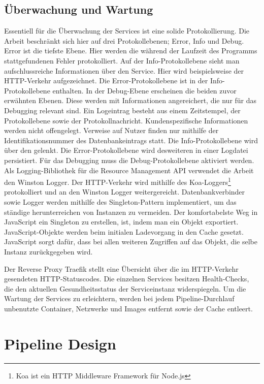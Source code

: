 \subsection{Überwachung und Wartung}
\label{subsec:ueberwachungundwartung}
Essentiell für die Überwachung der Services ist eine solide Protokollierung.
Die Arbeit beschränkt sich hier auf drei Protokollebenen; Error, Info und Debug.
Error ist die tiefste Ebene. Hier werden die während der Laufzeit des Programms
stattgefundenen Fehler protokolliert. Auf der Info-Protokollebene sieht man
aufschlussreiche Informationen über den Service. Hier wird beispielsweise
der HTTP-Verkehr aufgezeichnet. Die Error-Protokollebene ist in der Info-Protokollebene
enthalten. In der Debug-Ebene erscheinen die beiden zuvor erwähnten Ebenen. Diese
werden mit Informationen angereichert, die nur für das Debugging relevant sind.
Ein Logeintrag besteht aus einem Zeitstempel, der Protokollebene sowie der Protokollnachricht.
Kundenspezifische Informationen werden nicht offengelegt. Verweise auf Nutzer finden nur
mithilfe der Identifikationsnummer des Datenbankeintrags statt. Die Info-Protokollebene
wird über den  gelenkt. Die Error-Protokollebene wird desweiteren in einer
Logdatei persistiert. Für das Debugging muss die Debug-Protokollebene aktiviert werden.
Als Logging-Bibliothek für die Resource Management API verwendet die Arbeit den Winston
Logger. Der HTTP-Verkehr wird mithilfe des Koa-Loggers\footnote{Koa ist ein HTTP Middleware Framework für Node.js} protokolliert und an den Winston
Logger weitergereicht. Datenbankverbinder sowie Logger werden mithilfe des Singleton-Pattern
implementiert, um das ständige herunterreichen von Instanzen zu vermeiden. Der komfortabelste
Weg in JavaScript ein Singleton zu erstellen, ist, indem man ein Objekt exportiert. JavaScript-Objekte
werden beim initialen Ladevorgang in den Cache gesetzt. JavaScript sorgt dafür,
dass bei allen weiteren Zugriffen auf das Objekt, die selbe Instanz zurückgegeben wird.\cite{NodeJsCaching}

Der Reverse Proxy Traefik stellt eine Übersicht über die im HTTP-Verkehr gesendeten 
HTTP-Statuscodes. Die einzelnen Services besitzen Health-Checks, die den aktuellen
Gesundheitsstatus der Serviceinstanz widerspiegeln. Um die Wartung der Services zu erleichtern,
werden bei jedem Pipeline-Durchlauf unbenutzte Container, Netzwerke und Images
entfernt sowie der Cache entleert.

\section{Pipeline Design}
\label{sec:pipelinedesign}



